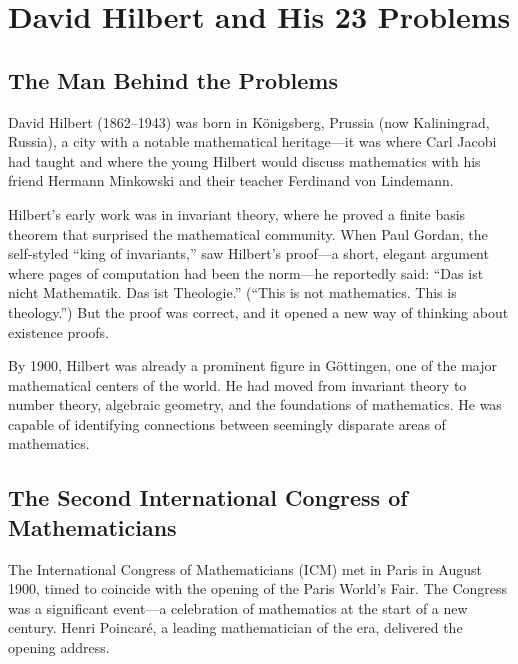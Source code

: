 
\chapter*{David Hilbert and His 23 Problems}
\renewcommand{\thesection}{\arabic{section}}

\section{The Man Behind the Problems}

David Hilbert (1862--1943) was born in K\"onigsberg, Prussia (now Kaliningrad, Russia), a city with a notable mathematical heritage---it was where Carl Jacobi had taught and where the young Hilbert would discuss mathematics with his friend Hermann Minkowski and their teacher Ferdinand von Lindemann.

Hilbert's early work was in invariant theory, where he proved a finite basis theorem that surprised the mathematical community. When Paul Gordan, the self-styled ``king of invariants,'' saw Hilbert's proof---a short, elegant argument where pages of computation had been the norm---he reportedly said: ``Das ist nicht Mathematik. Das ist Theologie.'' (``This is not mathematics. This is theology.'') But the proof was correct, and it opened a new way of thinking about existence proofs.

By 1900, Hilbert was already a prominent figure in G\"ottingen, one of the major mathematical centers of the world. He had moved from invariant theory to number theory, algebraic geometry, and the foundations of mathematics. He was capable of identifying connections between seemingly disparate areas of mathematics.

\section{The Second International Congress of Mathematicians}

The International Congress of Mathematicians (ICM) met in Paris in August 1900, timed to coincide with the opening of the Paris World's Fair. The Congress was a significant event---a celebration of mathematics at the start of a new century. Henri Poincar\'e, a leading mathematician of the era, delivered the opening address.

